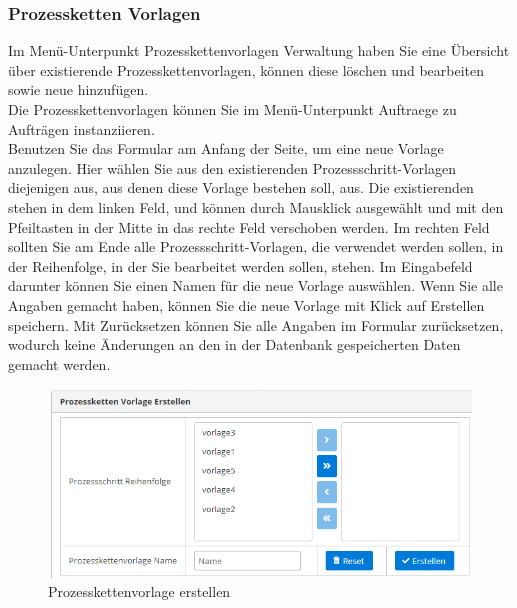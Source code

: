 \documentclass[enabledeprecatedfontcommands,fontsize=12pt,paper=a4,twoside]{scrartcl}
\begin{document}
\subsubsection{Prozessketten Vorlagen}

Im Menü-Unterpunkt Prozesskettenvorlagen Verwaltung haben Sie eine Übersicht über existierende Prozesskettenvorlagen, können diese löschen und bearbeiten sowie neue hinzufügen. \\

Die Prozesskettenvorlagen können Sie im Menü-Unterpunkt Auftraege zu Aufträgen instanziieren. \\

Benutzen Sie das Formular am Anfang der Seite, um eine neue Vorlage anzulegen. Hier wählen Sie aus den existierenden Prozessschritt-Vorlagen diejenigen aus, aus denen diese Vorlage bestehen soll, aus. Die existierenden stehen in dem linken Feld, und können durch Mausklick ausgewählt und mit den Pfeiltasten in der Mitte in das rechte Feld verschoben werden. Im rechten Feld sollten Sie am Ende alle Prozessschritt-Vorlagen, die verwendet werden sollen, in der Reihenfolge, in der Sie bearbeitet werden sollen, stehen. Im Eingabefeld darunter können Sie einen Namen für die neue Vorlage auswählen. Wenn Sie alle Angaben gemacht haben, können Sie die neue Vorlage mit Klick auf Erstellen speichern. Mit Zurücksetzen können Sie alle Angaben im Formular zurücksetzen, wodurch keine Änderungen an den in der Datenbank gespeicherten Daten gemacht werden. \\

\begin{figure}[h!]
\begin{center}
 \includegraphics[width=\textwidth]{screenshots/pk/prozesskettenvorlageform.png}
  \caption{Prozesskettenvorlage erstellen}
  \label{fig:boat2}
\end{center}
\end{figure}
\end{document}

